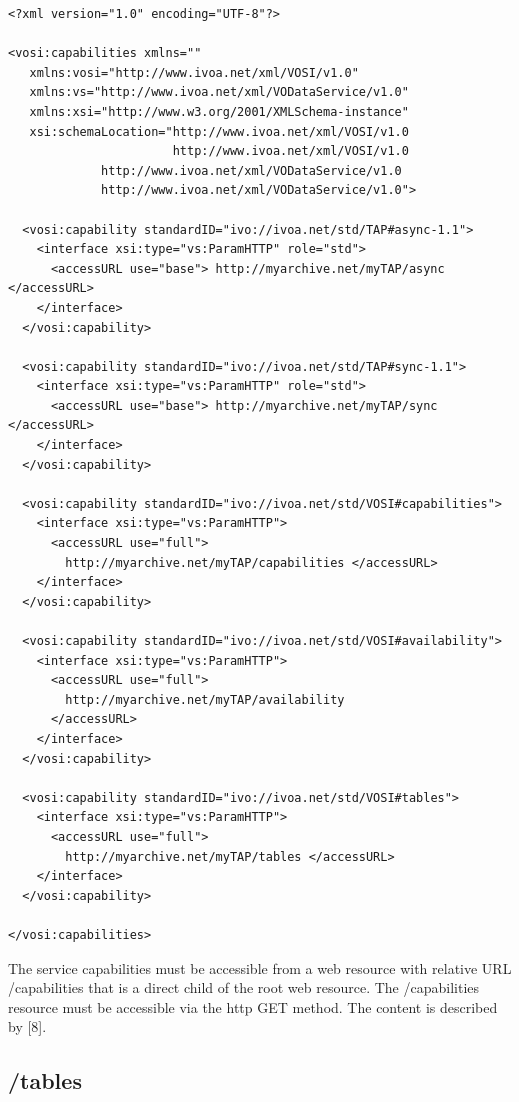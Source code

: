 \documentclass[11pt,letter]{ivoa}
\begin{document}
\begin{verbatim}
<?xml version="1.0" encoding="UTF-8"?>

<vosi:capabilities xmlns=""
   xmlns:vosi="http://www.ivoa.net/xml/VOSI/v1.0"
   xmlns:vs="http://www.ivoa.net/xml/VODataService/v1.0"
   xmlns:xsi="http://www.w3.org/2001/XMLSchema-instance"
   xsi:schemaLocation="http://www.ivoa.net/xml/VOSI/v1.0
                       http://www.ivoa.net/xml/VOSI/v1.0
             http://www.ivoa.net/xml/VODataService/v1.0
             http://www.ivoa.net/xml/VODataService/v1.0">

  <vosi:capability standardID="ivo://ivoa.net/std/TAP#async-1.1">
    <interface xsi:type="vs:ParamHTTP" role="std">
      <accessURL use="base"> http://myarchive.net/myTAP/async </accessURL>
    </interface>
  </vosi:capability>

  <vosi:capability standardID="ivo://ivoa.net/std/TAP#sync-1.1">
    <interface xsi:type="vs:ParamHTTP" role="std">
      <accessURL use="base"> http://myarchive.net/myTAP/sync </accessURL>
    </interface>
  </vosi:capability>

  <vosi:capability standardID="ivo://ivoa.net/std/VOSI#capabilities">
    <interface xsi:type="vs:ParamHTTP">
      <accessURL use="full">
        http://myarchive.net/myTAP/capabilities </accessURL>
    </interface>
  </vosi:capability>

  <vosi:capability standardID="ivo://ivoa.net/std/VOSI#availability">
    <interface xsi:type="vs:ParamHTTP">
      <accessURL use="full">
        http://myarchive.net/myTAP/availability
      </accessURL>
    </interface>
  </vosi:capability>

  <vosi:capability standardID="ivo://ivoa.net/std/VOSI#tables">
    <interface xsi:type="vs:ParamHTTP">
      <accessURL use="full">
        http://myarchive.net/myTAP/tables </accessURL>
    </interface>
  </vosi:capability>

</vosi:capabilities>
\end{verbatim}

The service capabilities must be accessible from a web resource with relative 
URL /capabilities that is a direct child of the root web resource. The 
/capabilities resource must be accessible via the http GET method. The content 
is described by [8].

\subsection{/tables}
\label{sec:vosi-tables}
\end{document}

